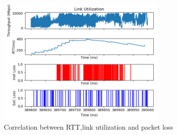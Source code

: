 \begin{figure}[t]
    \centering
        \includegraphics[width=0.75\textwidth]{Figures/correlation.png}
    \caption[Correlation between RTT,link utilization and packet loss]{Correlation between RTT,link utilization and packet loss}
    \label{fig:correlation}
    \bigskip
\end{figure}

